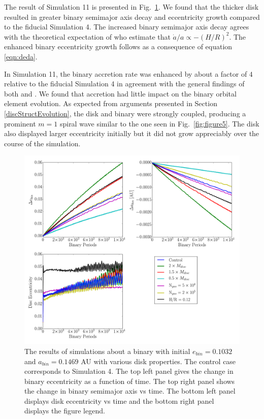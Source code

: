 The result of Simulation 11 is presented in Fig.~\ref{fig:figure9}.  We found that the thicker disk resulted in greater binary semimajor axis decay and 
eccentricity growth compared to the fiducial Simulation 4.  The increased binary semimajor axis decay agrees with the theoretical expectation of 
\citet{Arty96b,Arty2000} who estimate that $\dot{a}/a \propto -(H/R)^2$.  The enhanced binary eccentricity growth follows as a consequence of equation 
\ref{eqn:deda}.

In Simulation 11, the binary accretion rate was enhanced by about a factor of $4$ relative to the fiducial Simulation 4 in agreement with the general 
findings of both \citet{Young15} and \citet{Ragusa16}.  We found that accretion had little impact on the binary orbital element evolution.  As expected from arguments presented in Section \ref{discStructEvolution}, the disk and binary were strongly coupled, producing a prominent $m = 1$ spiral wave similar to the one seen in Fig.~\ref{fig:figure5}.  The disk also displayed larger eccentricity initially but it did not grow appreciably over the course of the 
simulation.  
	
\begin{figure}
	\includegraphics[width=\textwidth]{f9}
    \caption{The results of simulations about a binary with initial $e_{bin} = 0.1032$ and $a_{bin} = 0.1469$ AU with various disk properties.  The control case corresponds to Simulation 4.  The top left panel gives the change in binary eccentricity as a function of time.  The top right panel shows the change in binary semimajor axis vs time.  The bottom left panel displays disk eccentricity vs time and the bottom right panel displays the figure legend.}
    \label{fig:figure9}
\end{figure}
	
